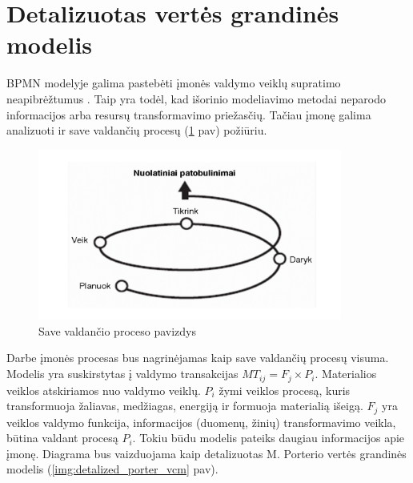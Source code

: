 \documentclass{VUMIFInfBakalaurinis}
\begin{document}
\begin{center}
\begin{longtable}{ | p{0.5cm} | p{2cm} |  p{7cm} | p{4cm} |}
    \hline
    \end{longtable}
\end{center}

\section{Detalizuotas vertės grandinės modelis}
BPMN modelyje galima pastebėti įmonės valdymo veiklų supratimo neapibrėžtumus \cite{bpmnPorterModel}. Taip yra todėl, kad išorinio modeliavimo metodai neparodo informacijos arba resursų transformavimo priežasčių. Tačiau įmonę galima analizuoti ir save valdančių procesų (\ref{img:plan_do_check_act} pav) požiūriu.  
\begin{figure}[H]
	\centering
	\includegraphics[width=10cm]{img/plan_do_check_act}
	\caption{Save valdančio proceso pavizdys}
	\label{img:plan_do_check_act}
\end{figure} 

Darbe įmonės procesas bus nagrinėjamas kaip save valdančių procesų visuma. Modelis yra suskirstytas į valdymo transakcijas $ MT_{ij} = F_j \times P_i$. Materialios veiklos atskiriamos nuo valdymo veiklų. $P_i$ žymi veiklos procesą, kuris transformuoja žaliavas, medžiagas, energiją ir formuoja materialią išeigą.
$F_j$ yra veiklos valdymo funkcija, informacijos (duomenų, žinių) transformavimo veikla, būtina valdant procesą $P_i$. Tokiu būdu modelis pateiks daugiau informacijos apie įmonę. Diagrama bus vaizduojama kaip detalizuotas M. Porterio vertės grandinės modelis (\ref{img:detalized_porter_vcm} pav).
\end{document}
